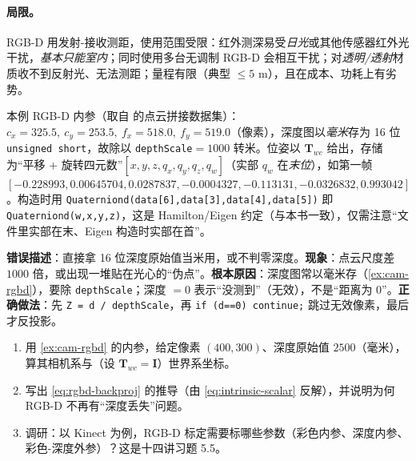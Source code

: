 \paragraph{局限。}
RGB-D 用发射-接收测距，使用范围受限\cite{gaoxiang2019slam14}：红外测深易受\emph{日光}或其他传感器红外光干扰，\emph{基本只能室内}；同时使用多台无调制 RGB-D 会相互干扰；对\emph{透明/透射}材质收不到反射光、无法测距；量程有限（典型 $\le5$ m\cite{carlone2026handbook}），且在成本、功耗上有劣势。

\begin{example}\label{ex:cam-rgbd}
本例 RGB-D 内参（取自\cite{gaoxiang2019slam14} 的点云拼接数据集）：$c_x=325.5,\ c_y=253.5,\ f_x=518.0,\ f_y=519.0$（像素），深度图以\emph{毫米}存为 16 位 \texttt{unsigned short}，故除以 \texttt{depthScale}$=1000$ 转米。位姿以 $\mathbf{T}_{wc}$ 给出，存储为“平移 $+$ 旋转四元数”$[x,y,z,q_x,q_y,q_z,q_w]$（实部 $q_w$ 在\emph{末位}），如第一帧 $[-0.228993,0.00645704,0.0287837,-0.0004327,-0.113131,-0.0326832,0.993042]$。构造时用 \texttt{Quaterniond(data[6],data[3],data[4],data[5])} 即 \texttt{Quaterniond(w,x,y,z)}，这是 Hamilton/Eigen 约定（与本书一致），仅需注意“文件里实部在末、Eigen 构造时实部在首”。
\end{example}

\begin{pitfall}
\textbf{错误描述}：直接拿 16 位深度原始值当米用，或不判零深度。\textbf{现象}：点云尺度差 $1000$ 倍，或出现一堆贴在光心的“伪点”。\textbf{根本原因}：深度图常以毫米存（\cref{ex:cam-rgbd}），要除 \texttt{depthScale}；深度 $=0$ 表示“没测到”（无效），不是“距离为 0”。\textbf{正确做法}：先 \texttt{Z = d / depthScale}，再 \texttt{if (d==0) continue;} 跳过无效像素，最后才反投影。
\end{pitfall}

\begin{practice}
\begin{enumerate}
  \item 用 \cref{ex:cam-rgbd} 的内参，给定像素 $(400,300)$、深度原始值 $2500$（毫米），算其相机系与（设 $\mathbf{T}_{wc}=\mathbf{I}$）世界系坐标。
  \item 写出 \cref{eq:rgbd-backproj} 的推导（由 \cref{eq:intrinsic-scalar} 反解），并说明为何 RGB-D 不再有“深度丢失”问题。
  \item 调研：以 Kinect 为例，RGB-D 标定需要标哪些参数（彩色内参、深度内参、彩色-深度外参）？这是十四讲习题 5.5\cite{gaoxiang2019slam14}。
\end{enumerate}
\end{practice}

